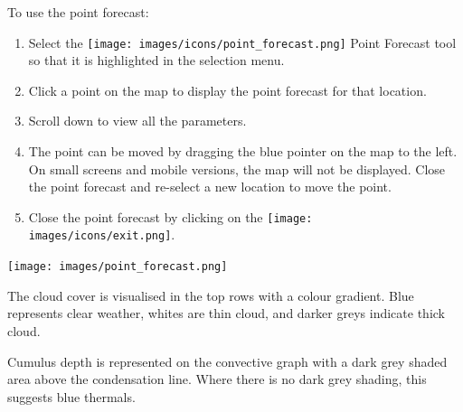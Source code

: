 \documentclass[11pt,a4paper]{article}
\begin{document}
To use the point forecast:
\begin{enumerate}
\item Select the \texttt{[image: images/icons/point\_forecast.png]} Point Forecast tool so that it is highlighted in the selection menu.
\item Click a point on the map to display the point forecast for that location.
\item Scroll down to view all the parameters.
\item The point can be moved by dragging the blue pointer on the map to the left. On small screens and mobile versions, the map will not be displayed. Close the point forecast and re-select a new location to move the point.
\item Close the point forecast by clicking on the \texttt{[image: images/icons/exit.png]}.
\end{enumerate}
\begin{center}
\texttt{[image: images/point\_forecast.png]}
\end{center}
The cloud cover is visualised in the top rows with a colour gradient. Blue represents clear weather, whites are thin cloud, and darker greys indicate thick cloud.

Cumulus depth is represented on the convective graph with a dark grey shaded area above the condensation line. Where there is no dark grey shading, this suggests blue thermals.
\end{document}
